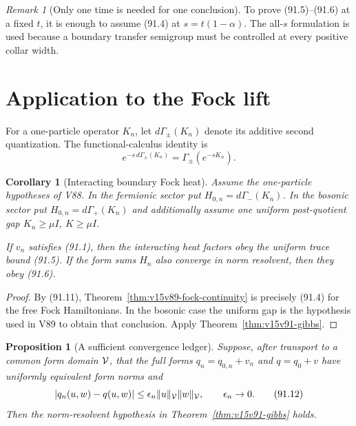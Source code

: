 \documentclass[11pt]{article}
\newtheorem{proposition}[theorem]{Proposition}
\newtheorem{corollary}[theorem]{Corollary}
\theoremstyle{remark}
\newtheorem{remark}[theorem]{Remark}
\begin{document}
\begin{remark}[Only one time is needed for one conclusion]
\label{rem:v15v91-one-time}
To prove (91.5)--(91.6) at a fixed \(t\), it is enough to assume
(91.4) at \(s=t(1-\alpha)\).  The all-\(s\) formulation is used
because a boundary transfer semigroup must be controlled at every
positive collar width.
\end{remark}

\section{Application to the Fock lift}

For a one-particle operator \(K_n\), let
\(d\Gamma_\pm(K_n)\) denote its additive second quantization.  The
functional-calculus identity is
\[
 e^{-s\,d\Gamma_\pm(K_n)}
 =\Gamma_\pm(e^{-sK_n}).                               \tag{91.11}
\]

\begin{corollary}[Interacting boundary Fock heat]
\label{cor:v15v91-fock}
Assume the one-particle hypotheses of V88.  In the fermionic sector
put \(H_{0,n}=d\Gamma_-(K_n)\).  In the bosonic sector put
\(H_{0,n}=d\Gamma_+(K_n)\) and additionally assume one uniform
post-quotient gap \(K_n\geq\mu I\), \(K\geq\mu I\).

If \(v_n\) satisfies (91.1), then the interacting heat factors obey
the uniform trace bound (91.5).  If the form sums \(H_n\) also
converge in norm resolvent, then they obey (91.6).
\end{corollary}

\begin{proof}
By (91.11), Theorem~\ref{thm:v15v89-fock-continuity} is precisely
(91.4) for the free Fock Hamiltonians.  In the bosonic case the
uniform gap is the hypothesis used in V89 to obtain that conclusion.
Apply Theorem~\ref{thm:v15v91-gibbs}.
\end{proof}

\begin{proposition}[A sufficient convergence ledger]
\label{prop:v15v91-form-convergence}
Suppose, after transport to a common form domain \({\cal V}\), that
the full forms \(q_n=q_{0,n}+v_n\) and \(q=q_0+v\) have uniformly
equivalent form norms and
\[
 |q_n(u,w)-q(u,w)|
 \leq\epsilon_n\|u\|_{\cal V}\|w\|_{\cal V},
 \qquad \epsilon_n\to0.                               \tag{91.12}
\]
Then the norm-resolvent hypothesis in
Theorem~\ref{thm:v15v91-gibbs} holds.
\end{proposition}
\end{document}
